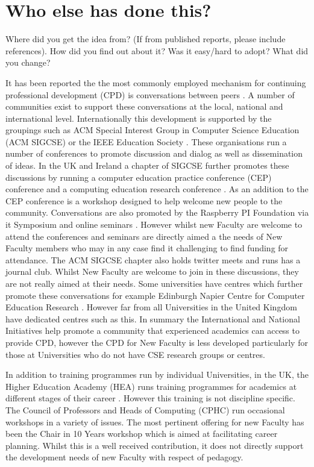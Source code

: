 \documentclass[sigconf]{acmart}
\begin{document}
\section{Who else has done this?}
Where did you get the idea from? (If from published reports, please include references). How did you find out about it? Was it easy/hard to adopt? What did you change?

It has been reported the the most commonly employed mechanism for continuing professional development (CPD) is conversations between peers \cite{King2004} . A number of communities exist to support these conversations at the local, national and international level.  Internationally this development is supported by the groupings such as ACM Special Interest Group in Computer Science Education (ACM SIGCSE) \cite{SIGCSE} or the IEEE Education Society \cite{IEEEES}.  These organisations run a number of conferences to promote discussion and dialog as well as dissemination of ideas. In the UK and Ireland a chapter of SIGCSE \cite{UKI-SIGCSE} further promotes these discussions by running a computer education practice conference (CEP) conference \cite{CEP} and a computing education research conference \cite{UKICER}. As an addition to the CEP conference is a workshop designed to help welcome new people to the community. Conversations are also promoted by the Raspberry PI Foundation via it Symposium \cite{PI_SYM} and online seminars \cite{PI_Sem}. However whilst new Faculty are welcome to attend the conferences and seminars are directly aimed a the needs of New Faculty members who may in any case find it challenging to find funding for attendance. The ACM SIGCSE chapter also holds twitter meets and runs has a journal club. Whilst New Faculty are welcome to join in these discussions, they are not really aimed at their needs.  Some universities have centres which further promote these conversations for example Edinburgh Napier Centre for Computer Education Research \cite{Napier}. However far from all Universities in the United Kingdom have dedicated centres such as this. In summary the International and National Initiatives help promote a community that experienced academics can access to provide CPD, however the CPD for New Faculty is less developed particularly for those at Universities who do not have CSE research groups or centres.

In addition to training programmes run by individual Universities, in the UK, the Higher Education Academy (HEA) runs training programmes for academics at different stages of their career \cite{HEATraining}. However this training is not discipline specific. The Council of Professors and Heads of Computing (CPHC) run occasional workshops in a variety of issues. The most pertinent offering for new Faculty has been the Chair in 10 Years workshop which is aimed at facilitating career planning. Whilst this is a well received contribution, it does not directly support the development needs of new Faculty with respect of pedagogy.
\end{document}
